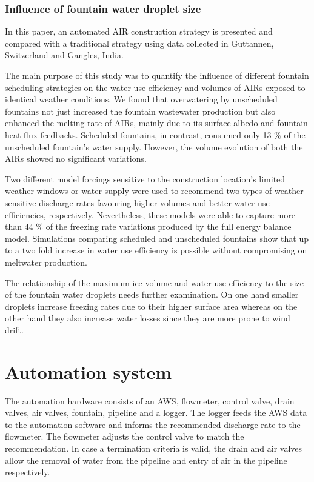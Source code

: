 \documentclass[tc, manuscript]{copernicus}
\begin{document}
\subsubsection{Influence of fountain water droplet size}

\conclusions

In this paper, an automated AIR construction strategy is presented and compared with a traditional strategy
using data collected in Guttannen, Switzerland and Gangles, India.

The main purpose of this study was to quantify the influence of different fountain scheduling strategies on the
water use efficiency and volumes of AIRs exposed to identical weather conditions. We found that overwatering by
unscheduled fountains not just increased the fountain wastewater production but also enhanced the melting rate
of AIRs, mainly due to its surface albedo and fountain heat flux feedbacks. Scheduled fountains, in contrast,
consumed only 13 \% of the unscheduled fountain's water supply. However, the volume evolution of both the AIRs
showed no significant variations. 

Two different model forcings sensitive to the construction location's limited weather windows or water supply
were used to recommend two types of weather-sensitive discharge rates favouring higher volumes and better water
use efficiencies, respectively. Nevertheless, these models were able to capture more than 44 \% of the freezing
rate variations produced by the full energy balance model. Simulations comparing scheduled and unscheduled
fountains show that up to a two fold increase in water use efficiency is possible without compromising on
meltwater production.

The relationship of the maximum ice volume and water use efficiency to the size of the fountain water droplets
needs further examination. On one hand smaller droplets increase freezing rates due to their higher surface area
whereas on the other hand they also increase water losses since they are more prone to wind drift.

\appendix


\section{Automation system} \label{sec:auto_system}

The automation hardware consists of an AWS, flowmeter, control valve, drain valves, air valves, fountain,
pipeline and a logger. The logger feeds the AWS data to the automation software and informs the recommended
discharge rate to the flowmeter. The flowmeter adjusts the control valve to match the recommendation. In case a
termination criteria is valid, the drain and air valves allow the removal of water from the pipeline and entry
of air in the pipeline respectively.
\end{document}
